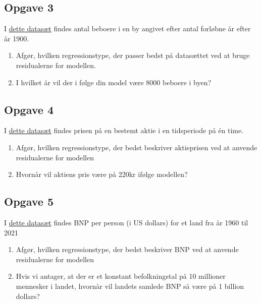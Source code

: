 \subsection*{Opgave 3}

I \href{https://github.com/ChristianJLex/TeachingNotes/raw/master/2023-2024/Data%20og%20lign/beboereResidual.xlsx}{\color{blue!60} dette datasæt} findes antal beboere i en by angivet efter antal forløbne år efter år 1900.

\begin{enumerate}[label=\roman*)]
	\item Afgør, hvilken regressionstype, der passer bedst på datasættet ved at bruge 
	residualerne for modellen.
	\item I hvilket år vil der i følge din model være 8000 beboere i byen?
\end{enumerate}

\subsection*{Opgave 4}

I \href{https://github.com/ChristianJLex/TeachingNotes/raw/master/2023-2024/Data%20og%20lign/aktieResidual.xlsx}{\color{blue!60} dette datasæt} findes prisen på en bestemt aktie i en tidsperiode på én time.

\begin{enumerate}[label=\roman*)]
	\item Afgør, hvilken regressionstype, der bedst beskriver aktieprisen ved at anvende residualerne for modellen
	\item Hvornår vil aktiens pris være på 220kr ifølge modellen?
\end{enumerate}

\subsection*{Opgave 5}

I \href{https://github.com/ChristianJLex/TeachingNotes/raw/master/2023-2024/Data%20og%20lign/BNPResidual.xlsx}{\color{blue!60} dette datasæt} findes BNP per person (i US dollars) for et land fra år 1960 til 2021
\begin{enumerate}[label=\roman*)]
	\item Afgør, hvilken regressionstype, der bedst beskriver BNP ved at anvende residualerne for modellen
	\item Hvis vi antager, at der er et konstant befolkningstal på 10 millioner mennesker i landet, hvornår vil landets samlede BNP så være på 1 billion dollars?
	
\end{enumerate}